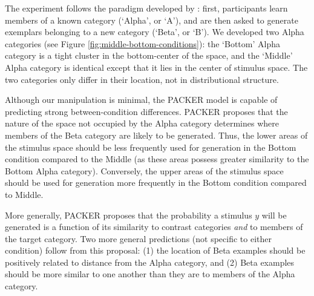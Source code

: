 \documentclass[10pt,letterpaper]{article}
\begin{document}
The experiment follows the paradigm developed by \citet{jern2013probabilistic}: first, participants learn members of a known category (`Alpha', or `A'), and are then asked to generate exemplars belonging to a new category (`Beta', or `B'). We developed two Alpha categories (see Figure \ref{fig:middle-bottom-conditions}): the `Bottom' Alpha category is a tight cluster in the bottom-center of the space, and the `Middle' Alpha category is identical except that it lies in the center of stimulus space. The two categories only differ in their location, not in  distributional structure. 






Although our manipulation is minimal, the PACKER model is capable of predicting strong between-condition differences. PACKER proposes that the nature of the space not occupied by the Alpha category determines where members of the Beta category are likely to be generated. Thus, the lower areas of the stimulus space should be less frequently used for generation in the Bottom condition compared to the Middle (as these areas possess greater similarity to the Bottom Alpha category). Conversely, the upper areas of the stimulus space should be used for generation more frequently in the Bottom condition compared to Middle.


More generally, PACKER proposes that the probability a stimulus $y$ will be generated is a function of its similarity to contrast categories \textit{and} to members of the target category. Two more general predictions (not specific to either condition) follow from this proposal: (1) the location of Beta examples should be positively related to distance from the Alpha category, and (2) Beta examples should be more similar to one another than they are to members of the Alpha category.
\end{document}
